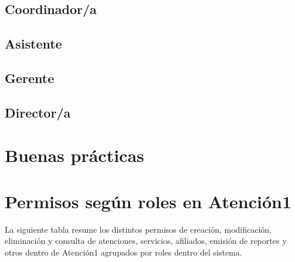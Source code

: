 \documentclass[letterpaper,10pt,spanish]{sphinxmanual}
\begin{document}
\section{Coordinador/a}
\label{\detokenize{04coordinador:coordinador-a}}\label{\detokenize{04coordinador::doc}}

\section{Asistente}
\label{\detokenize{05asistente:asistente}}\label{\detokenize{05asistente::doc}}

\section{Gerente}
\label{\detokenize{06gerente:gerente}}\label{\detokenize{06gerente::doc}}

\section{Director/a}
\label{\detokenize{07director:director-a}}\label{\detokenize{07director::doc}}

\chapter{Buenas prácticas}
\label{\detokenize{03buenas_pr_xe1cticas:buenas-practicas}}\label{\detokenize{03buenas_pr_xe1cticas::doc}}

\chapter{Permisos según roles en Atención\sphinxhyphen{}1}
\label{\detokenize{04permisos:permisos-segun-roles-en-atencion-1}}\label{\detokenize{04permisos::doc}}
La siguiente tabla resume los distintos permisos de creación, modificación, eliminación y consulta de atenciones, servicios, afiliados, emisión de reportes y otros dentro de Atención\sphinxhyphen{}1 agrupados por roles dentro del sistema.
\end{document}
